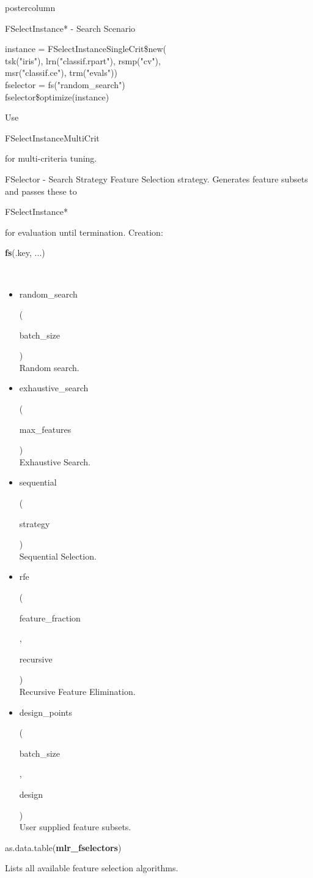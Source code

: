 \documentclass{beamer}
\newcommand{\codeinline}[1]{\begin{codeboxinline}#1\end{codeboxinline}}
\begin{document}
\begin{frame}[fragile]{}
\begin{columns}
\begin{column}{.245\textwidth}
\begin{beamercolorbox}[center]{postercolumn}
\begin{minipage}{.98\textwidth}
{\begin{myblock}{FSelectInstance* - Search Scenario}
							\begin{codeboxexample}
								{\scriptsize
									instance = FSelectInstanceSingleCrit\$new(\\
									\hspace*{1ex} tsk("iris"), lrn("classif.rpart"), rsmp("cv"),\\ 	\hspace*{1ex} msr("classif.ce"), trm("evals"))\\
									fselector = fs("random\_search")\\
									fselector\$optimize(instance)}
							\end{codeboxexample}
							Use \codeinline{FSelectInstanceMultiCrit} for multi-criteria tuning.
						\end{myblock}
						\begin{myblock}{FSelector - Search Strategy}
						Feature Selection strategy. 
						Generates feature subsets and passes these to \codeinline{FSelectInstance*} for evaluation until termination.
						Creation: \codeinline{\textbf{fs}(.key, ...)}
						\\
						\begin{itemize}
							\item \codeinline{random\_search}
							(\codeinline{batch\_size})\\
							Random search.
							\item \codeinline{exhaustive\_search}
							(\codeinline{max\_features})\\
							Exhaustive Search.
							\item \codeinline{sequential}
							(\codeinline{strategy})\\
							Sequential Selection.
							\item \codeinline{rfe}
							(\codeinline{feature\_fraction}, \codeinline{recursive})\\
							Recursive Feature Elimination.\\
							\item \codeinline{design\_points}
							(\codeinline{batch\_size }, \codeinline{design})\\
							User supplied feature subsets.
						\end{itemize}
						\vspace{1em}
						\begin{codebox}
							as.data.table(\textbf{mlr\_fselectors})
						\end{codebox}
						Lists all available feature selection algorithms.
					\end{myblock}
}
\end{minipage}
\end{beamercolorbox}
\end{column}
\end{columns}
\end{frame}
\end{document}
